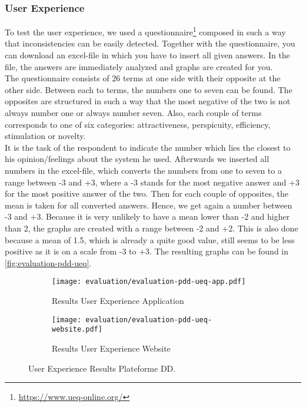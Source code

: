 \subsubsection{User Experience}
To test the user experience, we used a questionnaire\footnote{\url{https://www.ueq-online.org/}} composed in such a way that inconsistencies can be easily detected. Together with the questionnaire, you can download an excel-file in which you have to insert all given answers. In the file, the answers are immediately analyzed and graphs are created for you.\\

The questionnaire consists of 26 terms at one side with their opposite at the other side. Between each to terms, the numbers one to seven can be found. The opposites are structured in such a way that the most negative of the two is not always number one or always number seven. Also, each couple of terms corresponds to one of six categories: attractiveness, perspicuity, efficiency, stimulation or novelty.\\

It is the task of the respondent to indicate the number which lies the closest to his opinion/feelings about the system he used. Afterwards we inserted all numbers in the excel-file, which converts the numbers from one to seven to a range between -3 and +3, where a -3 stands for the most negative answer and +3 for the most positive answer of the two. Then for each couple of opposites, the mean is taken for all converted answers. Hence, we get again a number between -3 and +3. Because it is very unlikely to have a mean lower than -2 and higher than 2, the graphs are created with a range between -2 and +2. This is also done because a mean of 1.5, which is already a quite good value, still seems to be less positive as it is on a scale from -3 to +3. The resulting graphs can be found in \autoref{fig:evaluation-pdd-ueq}.

\begin{figure}[h]
	\centering
	\begin{subfigure}{.49\textwidth}
  		\centering
  		\texttt{[image: evaluation/evaluation-pdd-ueq-app.pdf]}
  		\caption{Results User Experience Application}
	\end{subfigure}%
	\begin{subfigure}{.49\textwidth}
  		\centering
  		\texttt{[image: evaluation/evaluation-pdd-ueq-website.pdf]}
  		\caption{Results User Experience Website}
	\end{subfigure}
	\caption{User Experience Results Plateforme DD.}
	\label{fig:evaluation-pdd-ueq}
\end{figure}

\color{black}



